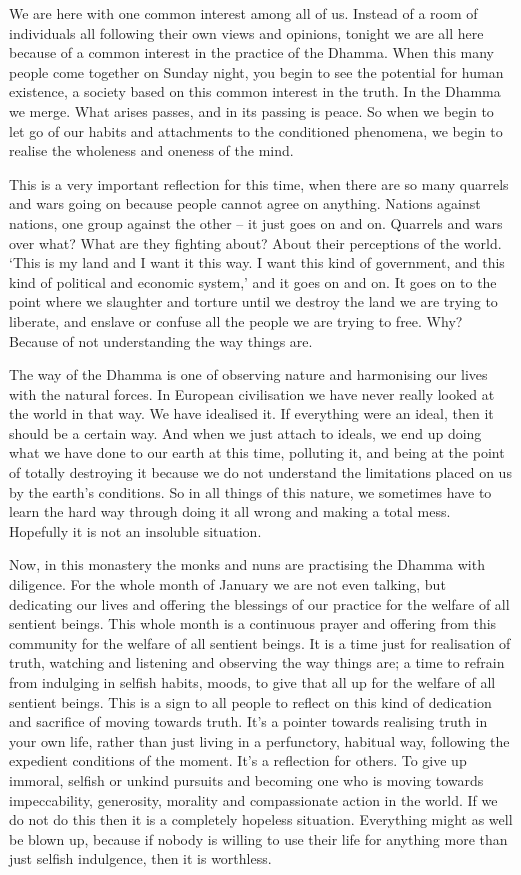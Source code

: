 
We are here with one common interest among all of us. Instead of a room of individuals all following their own views and opinions, tonight we are all here because of a common interest in the practice of the Dhamma. When this many people come together on Sunday night, you begin to see the potential for human existence, a society based on this common interest in the truth. In the Dhamma we merge. What arises passes, and in its passing is peace. So when we begin to let go of our habits and attachments to the conditioned phenomena, we begin to realise the wholeness and oneness of the mind.

This is a very important reflection for this time, when there are so many quarrels and wars going on because people cannot agree on anything. Nations against nations, one group against the other -- it just goes on and on. Quarrels and wars over what? What are they fighting about? About their perceptions of the world. `This is my land and I want it this way. I want this kind of government, and this kind of political and economic system,' and it goes on and on. It goes on to the point where we slaughter and torture until we destroy the land we are trying to liberate, and enslave or confuse all the people we are trying to free. Why? Because of not understanding the way things are.

The way of the Dhamma is one of observing nature and harmonising our lives with the natural forces. In European civilisation we have never really looked at the world in that way. We have idealised it. If everything were an ideal, then it should be a certain way. And when we just attach to ideals, we end up doing what we have done to our earth at this time, polluting it, and being at the point of totally destroying it because we do not understand the limitations placed on us by the earth's conditions. So in all things of this nature, we sometimes have to learn the hard way through doing it all wrong and making a total mess. Hopefully it is not an insoluble situation.

Now, in this monastery the monks and nuns are practising the Dhamma with diligence. For the whole month of January we are not even talking, but dedicating our lives and offering the blessings of our practice for the welfare of all sentient beings. This whole month is a continuous prayer and offering from this community for the welfare of all sentient beings. It is a time just for realisation of truth, watching and listening and observing the way things are; a time to refrain from indulging in selfish habits, moods, to give that all up for the welfare of all sentient beings. This is a sign to all people to reflect on this kind of dedication and sacrifice of moving towards truth. It's a pointer towards realising truth in your own life, rather than just living in a perfunctory, habitual way, following the expedient conditions of the moment. It's a reflection for others. To give up immoral, selfish or unkind pursuits and becoming one who is moving towards impeccability, generosity, morality and compassionate action in the world. If we do not do this then it is a completely hopeless situation. Everything might as well be blown up, because if nobody is willing to use their life for anything more than just selfish indulgence, then it is worthless.

